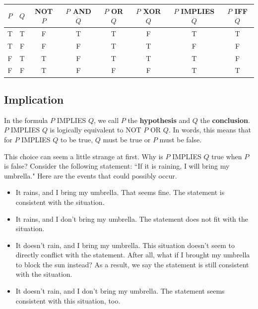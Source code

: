 \documentclass[12pt,letterpaper]{article}
\begin{document}
\begin{tabular}{c|c|c|c|c|c|c|c}
 $P$ & $Q$ & NOT $P$ & $P$ AND $Q$ & $P$ OR $Q$ & $P$ XOR $Q$ & $P$ IMPLIES $Q$ & $P$ IFF $Q$\\
\hline
T & T & F & T & T & F & T & T\\
T & F & F & F & T & T & F & F\\
F & T & T & F & T & T & T & F\\
F & F & T & F & F & F & T & T
\end{tabular}



\subsection{Implication}

In the formula $P$ IMPLIES $Q$, we call $P$ the \textbf{hypothesis} and $Q$ the \textbf{conclusion}. $P$ IMPLIES $Q$ is logically equivalent to NOT $P$ OR $Q$. In words, this means that for $P$ IMPLIES $Q$ to be true, $Q$ must be true or $P$ must be false.

This choice can seem a little strange at first. Why is $P$ IMPLIES $Q$ true when $P$ is false? Consider the following statement: ``If it is raining, I will bring my umbrella." Here are the events that could possibly occur.

\begin{itemize}
    \item It rains, and I bring my umbrella. That seems fine. The statement is consistent with the situation.
    \item It rains, and I don't bring my umbrella. The statement does not fit with the situation.
    \item It doesn't rain, and I bring my umbrella. This situation doesn't seem to directly conflict with the statement. After all, what if I brought my umbrella to block the sun instead? As a result, we say the statement is still consistent with the situation.
    \item It doesn't rain, and I don't bring my umbrella. The statement seems consistent with this situation, too.
\end{itemize}
\end{document}
